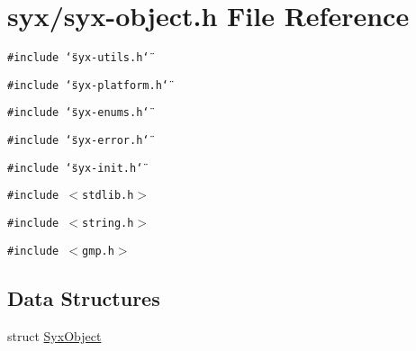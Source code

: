 \hypertarget{syx-object_8h}{
\section{syx/syx-object.h File Reference}
\label{syx-object_8h}
}
{\tt \#include \char`\"{}syx-utils.h\char`\"{}}\par
{\tt \#include \char`\"{}syx-platform.h\char`\"{}}\par
{\tt \#include \char`\"{}syx-enums.h\char`\"{}}\par
{\tt \#include \char`\"{}syx-error.h\char`\"{}}\par
{\tt \#include \char`\"{}syx-init.h\char`\"{}}\par
{\tt \#include $<$stdlib.h$>$}\par
{\tt \#include $<$string.h$>$}\par
{\tt \#include $<$gmp.h$>$}\par
\subsection*{Data Structures}
\begin{CompactItemize}
\item 
struct \hyperlink{struct_syx_object}{SyxObject}
\end{CompactItemize}
